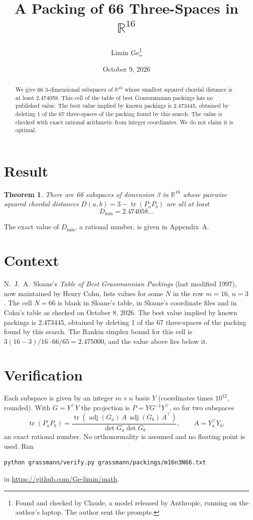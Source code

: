 \documentclass[11pt,a4paper]{article}
\title{A Packing of 66 Three-Spaces in $\mathbb{R}^{16}$}
\author{Limin Ge\thanks{Found and checked by Claude, a model released by Anthropic, running on the author's laptop. The author sent the prompts.}}
\date{October 9, 2026}
\newtheorem*{theorem}{Theorem}
\begin{document}
\maketitle
\begin{abstract}
We give 66 3-dimensional subspaces of $\mathbb{R}^{16}$ whose smallest squared chordal distance is at least 2.474058. This cell of the table of best Grassmannian packings has no published value. The best value implied by known packings is 2.473445, obtained by deleting 1 of the 67 three-spaces of the packing found by this search. The value is checked with exact rational arithmetic from integer coordinates. We do not claim it is optimal.
\end{abstract}

\section{Result}
\begin{theorem}
There are 66 subspaces of dimension 3 in $\mathbb{R}^{16}$ whose pairwise squared chordal distances $D(a,b) = 3 - \operatorname{tr}(P_aP_b)$ are all at least
\[ D_{\min} = 2.474058\ldots \]
\end{theorem}
The exact value of $D_{\min}$, a rational number, is given in Appendix~A.


\section{Context}
N.~J.~A.~Sloane's \emph{Table of Best Grassmannian Packings} (last modified 1997), now maintained by Henry Cohn, lists values for some $N$ in the row $m=16$, $n=3$. The cell $N=66$ is blank in Sloane's table, in Sloane's coordinate files and in Cohn's table as checked on October 8, 2026. The best value implied by known packings is 2.473445, obtained by deleting 1 of the 67 three-spaces of the packing found by this search. The Rankin simplex bound for this cell is $3(16-3)/16\cdot 66/65 = 2.475000$, and the value above lies below it.


\section{Verification}
Each subspace is given by an integer $m\times n$ basis $Y$ (coordinates times $10^{12}$, rounded). With $G=Y^\top Y$ the projection is $P=YG^{-1}Y^\top$, so for two subspaces
\[ \operatorname{tr}(P_aP_b)=\frac{\operatorname{tr}(\operatorname{adj}(G_a)\,A\,\operatorname{adj}(G_b)\,A^\top)}{\det G_a\det G_b},\qquad A=Y_a^\top Y_b, \]
an exact rational number. No orthonormality is assumed and no floating point is used. Run
\begin{verbatim}
python grassmann/verify.py grassmann/packings/m16n3N66.txt
\end{verbatim}
in \url{https://github.com/Ge-limin/math}.
\end{document}
